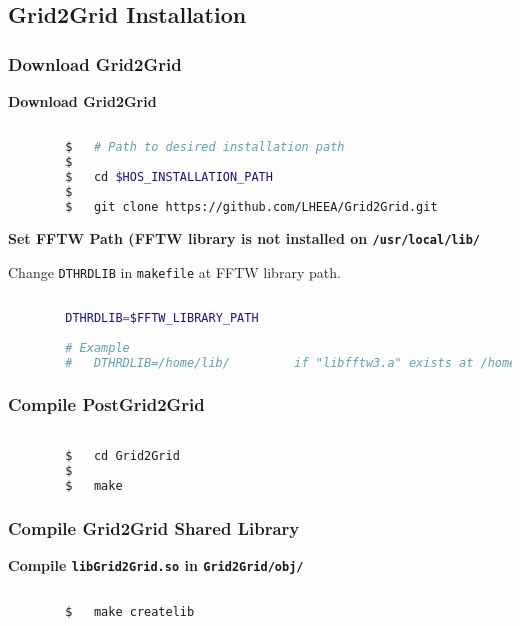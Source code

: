 		\pagebreak
		\subsection{Grid2Grid Installation}
		
		\label{chap:Grid2GridInstall}
		
		\subsubsection{Download Grid2Grid}
		
		\textbf{Download Grid2Grid}
		
		\begin{lstlisting}[language=bash]
		
		$	# Path to desired installation path
		$
		$	cd $HOS_INSTALLATION_PATH
		$
		$	git clone https://github.com/LHEEA/Grid2Grid.git
		\end{lstlisting}
		
		\vspace{0.2cm}
		
		\textbf{Set FFTW Path (FFTW library is not installed on \texttt{/usr/local/lib/}}
		
		Change \texttt{DTHRDLIB} in \texttt{makefile} at FFTW library path.
		
		\begin{lstlisting}[language=bash]
		
		DTHRDLIB=$FFTW_LIBRARY_PATH
		
		# Example
		#	DTHRDLIB=/home/lib/			if "libfftw3.a" exists at /home/lib/
		\end{lstlisting}
		
		\subsubsection{Compile PostGrid2Grid}
		
		\begin{lstlisting}[language=bash]										

		$	cd Grid2Grid
		$
		$	make 
		\end{lstlisting}
		
		\subsubsection{Compile Grid2Grid Shared Library}
		
		\textbf{Compile \texttt{libGrid2Grid.so} in \texttt{Grid2Grid/obj/}}
		
		\begin{lstlisting}[language=bash]
		
		$	make createlib
		\end{lstlisting}		
	
